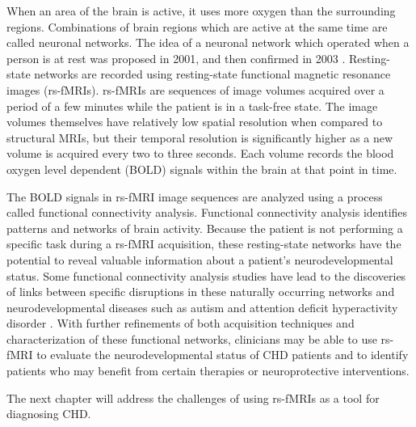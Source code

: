 When an area of the brain is active, it uses more oxygen than the surrounding regions. Combinations of brain regions which are active at the same time are called neuronal networks. The idea of a neuronal network which operated when a person is at rest was proposed in 2001, and then confirmed in 2003 \cite{Raichle2001} \cite{Greicius2003}. Resting-state networks are recorded using resting-state functional magnetic resonance images (rs-fMRIs). rs-fMRIs are sequences of image volumes acquired over a period of a few minutes while the patient is in a task-free state. The image volumes themselves have relatively low spatial resolution when compared to structural MRIs, but their temporal resolution is significantly higher as a new volume is acquired every two to three seconds. Each volume records the blood oxygen level dependent (BOLD) signals within the brain at that point in time. 

The BOLD signals in rs-fMRI image sequences are analyzed using a process called functional connectivity analysis. Functional connectivity analysis identifies patterns and networks of brain activity. Because the patient is not performing a specific task during a rs-fMRI acquisition, these resting-state networks have the potential to reveal valuable information about a patient's neurodevelopmental status. Some functional connectivity analysis studies have lead to the discoveries of links between specific disruptions in these naturally occurring networks and neurodevelopmental diseases such as autism and attention deficit hyperactivity disorder \cite{Assaf2010} \cite{Zang2007}. With further refinements of both acquisition techniques and characterization of these functional networks, clinicians may be able to use rs-fMRI to evaluate the neurodevelopmental status of CHD patients and to identify patients who may benefit from certain therapies or neuroprotective interventions.

The next chapter will address the challenges of using rs-fMRIs as a tool for diagnosing CHD.
